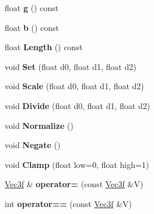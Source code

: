 \begin{DoxyCompactItemize}
\item 
\hypertarget{classVec3f_ad72c43c133ef70d2ddbc283e6c0a9229}{float {\bfseries g} () const }\label{classVec3f_ad72c43c133ef70d2ddbc283e6c0a9229}

\item 
\hypertarget{classVec3f_a022e6dd724965fa27ba4a448f54a66fe}{float {\bfseries b} () const }\label{classVec3f_a022e6dd724965fa27ba4a448f54a66fe}

\item 
\hypertarget{classVec3f_a4e785c2c10a9d63dc8579c5a00ed60d1}{float {\bfseries \-Length} () const }\label{classVec3f_a4e785c2c10a9d63dc8579c5a00ed60d1}

\item 
\hypertarget{classVec3f_a5271259ed70023efa9109f0ec717f3be}{void {\bfseries \-Set} (float d0, float d1, float d2)}\label{classVec3f_a5271259ed70023efa9109f0ec717f3be}

\item 
\hypertarget{classVec3f_a8a919312d46e28ef591d832e4b7d5896}{void {\bfseries \-Scale} (float d0, float d1, float d2)}\label{classVec3f_a8a919312d46e28ef591d832e4b7d5896}

\item 
\hypertarget{classVec3f_a741c1fcfc370c8f07610fb19bd6e5591}{void {\bfseries \-Divide} (float d0, float d1, float d2)}\label{classVec3f_a741c1fcfc370c8f07610fb19bd6e5591}

\item 
\hypertarget{classVec3f_af0a81998f92a3ec791f88e26dcba04b6}{void {\bfseries \-Normalize} ()}\label{classVec3f_af0a81998f92a3ec791f88e26dcba04b6}

\item 
\hypertarget{classVec3f_a52caf47ad4ce4e87ea8711372f686fcc}{void {\bfseries \-Negate} ()}\label{classVec3f_a52caf47ad4ce4e87ea8711372f686fcc}

\item 
\hypertarget{classVec3f_a6fde73a1fa95ab67c4ba418779ca1a93}{void {\bfseries \-Clamp} (float low=0, float high=1)}\label{classVec3f_a6fde73a1fa95ab67c4ba418779ca1a93}

\item 
\hypertarget{classVec3f_a87fd52c3a87f128e40ef26184f63631e}{\hyperlink{classVec3f}{\-Vec3f} \& {\bfseries operator=} (const \hyperlink{classVec3f}{\-Vec3f} \&\-V)}\label{classVec3f_a87fd52c3a87f128e40ef26184f63631e}

\item 
\hypertarget{classVec3f_a11cf71014645816cbb04a26cf6e05db5}{int {\bfseries operator==} (const \hyperlink{classVec3f}{\-Vec3f} \&\-V)}\label{classVec3f_a11cf71014645816cbb04a26cf6e05db5}


\end{DoxyCompactItemize}
